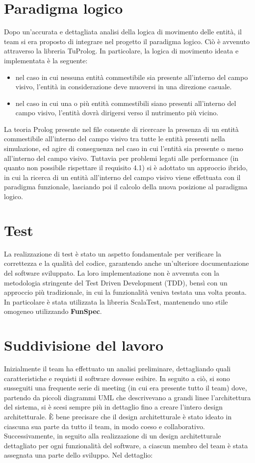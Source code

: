 \section{Paradigma logico}
Dopo un'accurata e dettagliata analisi della logica di movimento delle entità, il team si era proposto di integrare nel progetto il paradigma logico. Ciò è avvenuto attraverso la libreria TuProlog. In particolare, la logica di movimento ideata e implementata è la seguente:
\begin{itemize}
    \item nel caso in cui nessuna entità commestibile sia presente all'interno del campo visivo, l'entità in considerazione deve muoversi in una direzione casuale.
    \item nel caso in cui una o più entità commestibili siano presenti all'interno del campo visivo, l'entità dovrà dirigersi verso il nutrimento più vicino.
\end{itemize}
La teoria Prolog presente nel file  consente di ricercare la presenza di un entità commestibile all'interno del campo visivo tra tutte le entità presenti nella simulazione, ed agire di conseguenza nel caso in cui l'entità sia presente o meno all'interno del campo visivo. Tuttavia per problemi legati alle performance (in quanto non possibile rispettare il requisito 4.1) si è adottato un approccio ibrido, in cui la ricerca di un entità all'interno del campo visivo viene effettuata con il paradigma funzionale, lasciando poi il calcolo della nuova posizione al paradigma logico.

\section{Test}
La realizzazione di test è stato un aspetto fondamentale per verificare la correttezza e la qualità del codice, garantendo anche un'ulteriore documentazione del software sviluppato. La loro implementazione non è avvenuta con la metodologia stringente del Test Driven Development (TDD), bensì con un approccio più tradizionale, in cui la funzionalità veniva testata una volta pronta. In particolare è stata utilizzata la libreria ScalaTest, mantenendo uno stile omogeneo utilizzando \textbf{FunSpec}.

\section{Suddivisione del lavoro}
Inizialmente il team ha effettuato un analisi preliminare, dettagliando quali caratteristiche e requisti il software dovesse esibire. In seguito a ciò, si sono susseguiti una frequente serie di meeting (in cui era presente tutto il team) dove, partendo da piccoli diagrammi UML che descrivevano a grandi linee l'architettura del sistema, si è scesi sempre più in dettaglio fino a creare l'intero design architetturale. È bene precisare che il design architetturale è stato ideato in ciascuna sua parte da tutto il team, in modo coeso e collaborativo. Successivamente, in seguito alla realizzazione di un design architetturale dettagliato per ogni funzionalità del software, a ciascun membro del team è stata assegnata una parte dello sviluppo. Nel dettaglio:

